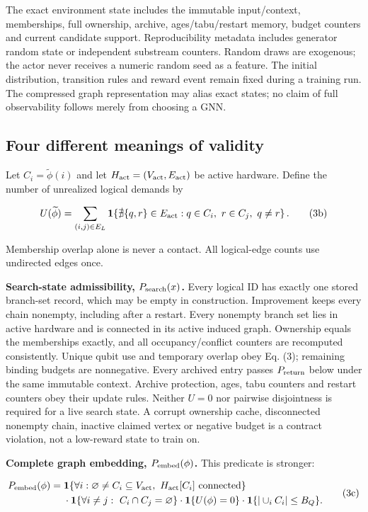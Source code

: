 \documentclass[10pt,a4paper]{article}
\begin{document}
The exact environment state includes the immutable input/context,
memberships, full ownership, archive, ages/tabu/restart memory, budget
counters and current candidate support. Reproducibility metadata
includes generator random state or independent substream counters.
Random draws are exogenous; the actor never receives a numeric random
seed as a feature. The initial distribution, transition rules and reward
event remain fixed during a training run. The compressed graph
representation may alias exact states; no claim of full observability
follows merely from choosing a GNN.

\hypertarget{four-different-meanings-of-validity}{%
\subsection{Four different meanings of
validity}\label{four-different-meanings-of-validity}}

Let \(C_i=\widetilde\phi(i)\) and let
\(H_{\rm act}=(V_{\rm act},E_{\rm act})\) be active hardware. Define the
number of unrealized logical demands by

\[
U(\widetilde\phi)=\sum_{(i,j)\in E_L}
\mathbf1\!\left\{\nexists\{q,r\}\in E_{\rm act}:q\in C_i,
\ r\in C_j,\ q\ne r\right\}.
\tag{3b}
\]

Membership overlap alone is never a contact. All logical-edge counts use
undirected edges once.

\textbf{Search-state admissibility, \(P_{\rm search}(x)\).} Every
logical ID has exactly one stored branch-set record, which may be empty
in construction. Improvement keeps every chain nonempty, including after
a restart. Every nonempty branch set lies in active hardware and is
connected in its active induced graph. Ownership equals the memberships
exactly, and all occupancy/conflict counters are recomputed
consistently. Unique qubit use and temporary overlap obey Eq. (3);
remaining binding budgets are nonnegative. Every archived entry passes
\(P_{\rm return}\) below under the same immutable context. Archive
protection, ages, tabu counters and restart counters obey their update
rules. Neither \(U=0\) nor pairwise disjointness is required for a live
search state. A corrupt ownership cache, disconnected nonempty chain,
inactive claimed vertex or negative budget is a contract violation, not
a low-reward state to train on.

\textbf{Complete graph embedding, \(P_{\rm embed}(\phi)\).} This
predicate is stronger:

\[
\begin{aligned}
P_{\rm embed}(\phi)={}&
\mathbf1\{\forall i:\varnothing\ne C_i\subseteq V_{\rm act},\ H_{\rm act}[C_i]\text{ connected}\}\\
&\cdot\mathbf1\{\forall i\ne j:\ C_i\cap C_j=\varnothing\}
\cdot\mathbf1\{U(\phi)=0\}
\cdot\mathbf1\{|\cup_iC_i|\le B_Q\}.
\end{aligned}
\tag{3c}
\]
\end{document}
